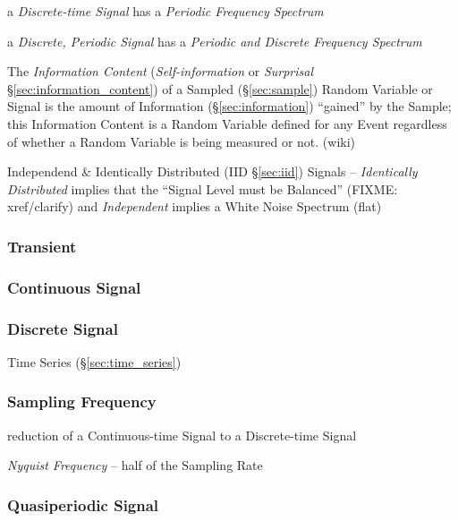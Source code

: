 a \emph{Discrete-time Signal} has a \emph{Periodic Frequency Spectrum}

a \emph{Discrete, Periodic Signal} has a \emph{Periodic and Discrete Frequency
  Spectrum}

The \emph{Information Content} (\emph{Self-information} or \emph{Surprisal}
\S\ref{sec:information_content}) of a Sampled (\S\ref{sec:sample}) Random
Variable or Signal is the amount of Information (\S\ref{sec:information})
``gained'' by the Sample; this Information Content is a Random Variable defined
for any Event regardless of whether a Random Variable is being measured or not.
(wiki)

Independend & Identically Distributed (IID \S\ref{sec:iid}) Signals --
\emph{Identically Distributed} implies that the ``Signal Level must be
Balanced'' (FIXME: xref/clarify) and \emph{Independent} implies a White Noise
Spectrum (flat)



\subsubsection{Transient}\label{sec:transient}

\subsubsection{Continuous Signal}\label{sec:continuous_signal}

\subsubsection{Discrete Signal}\label{sec:discrete_signal}

\fist Time Series (\S\ref{sec:time_series})



\subsubsection{Sampling Frequency}\label{sec:sampling_frequency}

reduction of a Continuous-time Signal to a Discrete-time Signal

\emph{Nyquist Frequency} -- half of the Sampling Rate



\subsubsection{Quasiperiodic Signal}\label{sec:quasiperiodic_signal}

